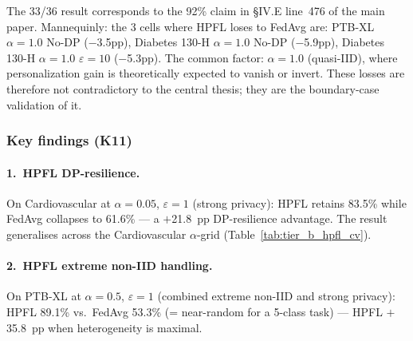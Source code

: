 \documentclass[conference]{IEEEtran}
\begin{document}
\begin{table}[htbp]
\centering
\caption{Per-dataset and aggregate paired win rate (HPFL vs.\ FedAvg, cell-mean comparison with $\pm$1pp tolerance).}
\label{tab:tier_b_winrate}
\small
{}
\end{table}

\noindent The 33/36 result corresponds to the 92\% claim in §IV.E line~476 of the main paper. Mannequinly: the 3 cells where HPFL loses to FedAvg are: PTB-XL $\alpha{=}1.0$ No-DP ($-$3.5pp), Diabetes 130-H $\alpha{=}1.0$ No-DP ($-$5.9pp), Diabetes 130-H $\alpha{=}1.0$ $\varepsilon{=}10$ ($-$5.3pp). The common factor: $\alpha{=}1.0$ (quasi-IID), where personalization gain is theoretically expected to vanish or invert. These losses are therefore not contradictory to the central thesis; they are the boundary-case validation of it.

\subsubsection*{Key findings (K11)}

\paragraph{1.\ HPFL DP-resilience.} On Cardiovascular at $\alpha{=}0.05$, $\varepsilon{=}1$ (strong privacy): HPFL retains 83.5\% while FedAvg collapses to 61.6\% --- a $+$21.8~pp DP-resilience advantage. The result generalises across the Cardiovascular $\alpha$-grid (Table~\ref{tab:tier_b_hpfl_cv}).

\paragraph{2.\ HPFL extreme non-IID handling.} On PTB-XL at $\alpha{=}0.5$, $\varepsilon{=}1$ (combined extreme non-IID and strong privacy): HPFL 89.1\% vs.\ FedAvg 53.3\% (= near-random for a 5-class task) --- HPFL $+$35.8~pp when heterogeneity is maximal.
\end{document}
